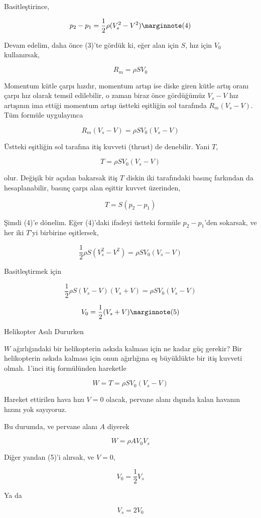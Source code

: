 \documentclass[12pt,fleqn]{article}\usepackage{../../common}
\begin{document}
Basitleştirince,

$$
p_2 - p_1 = \frac{1}{2} \rho (V_s^2 - V^2)
\mlabel{4}
$$

Devam edelim, daha önce (3)'te gördük ki, eğer alan için $S$, hız için
$V_0$ kullanırsak, 

$$
R_m = \rho S V_0
$$

Momentum kütle çarpı hızdır, momentum artışı ise diske giren kütle artış
oranı çarpı hız olarak temsil edilebilir, o zaman biraz önce gördüğümüz
$V_s-V$ hız artışının ima ettiği momentum artışı üstteki eşitliğin sol
tarafında $R_m (V_s - V)$. Tüm formüle uygulayınca 

$$
R_m (V_s - V) = \rho S V_0  (V_s - V)
$$

Üstteki eşitliğin sol tarafına itiş kuvveti (thrust) de denebilir. Yani
$T$,

$$
T = \rho S V_0  (V_s - V)
$$

olur. Değişik bir açıdan bakarsak itiş $T$ diskin iki tarafındaki basınç
farkından da hesaplanabilir, basınç çarpı alan eşittir kuvvet üzerinden,

$$
T = S (p_2 - p_1)
$$

Şimdi (4)'e dönelim. Eğer (4)'daki ifadeyi üstteki formüle $p_2-p_1$'den
sokarsak, ve her iki $T$'yi birbirine eşitlersek, 

$$
\frac{1}{2} \rho S (V_s^2 - V^2) = \rho S V_0 (V_s - V)
$$

Basitleştirmek için

$$
\frac{1}{2} \rho S (V_s - V)(V_s + V) = \rho S V_0 (V_s - V)
$$

$$
V_0 = \frac{1}{2} (V_s + V)  
\mlabel{5}
$$

Helikopter Asılı Dururken

$W$ ağırlığındaki bir helikopterin askıda kalması için ne kadar güç
gerekir? Bir helikopterin askıda kalması için onun ağırlığına eş büyüklükte
bir itiş kuvveti olmalı. 1'inci itiş formülünden hareketle

$$
W = T = \rho S V_0  (V_s - V)
$$

Hareket ettirilen hava hızı $V = 0$ olacak, pervane alanı dışında kalan
havanın hızını yok sayıyoruz.

Bu durumda, ve pervane alanı $A$ diyerek

$$
W = \rho A V_0 V_s
$$

Diğer yandan (5)'i alırsak, ve $V=0$,

$$
V_0 = \frac{1}{2} V_s
$$

Ya da

$$
V_s = 2 V_0
$$
\end{document}

